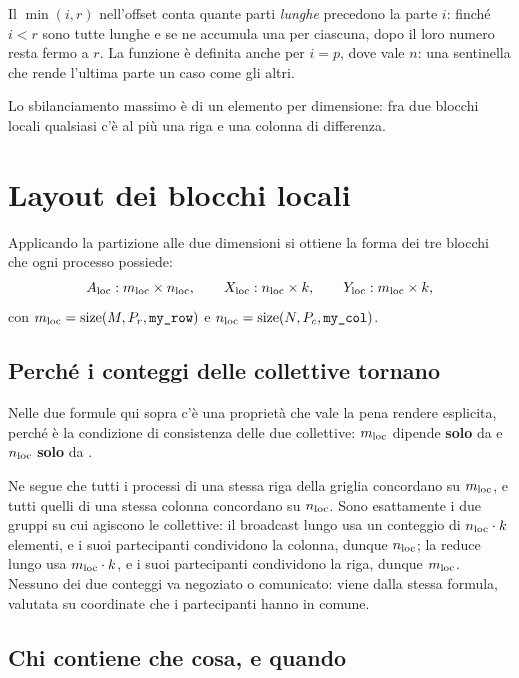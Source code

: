 Il $\min(i,r)$ nell'offset conta quante parti \emph{lunghe} precedono la parte
$i$: finché $i < r$ sono tutte lunghe e se ne accumula una per ciascuna, dopo
il loro numero resta fermo a $r$. La funzione è definita anche per $i = p$,
dove vale $n$: una sentinella che rende l'ultima parte un caso come gli altri.

Lo sbilanciamento massimo è di un elemento per dimensione: fra due blocchi
locali qualsiasi c'è al più una riga e una colonna di differenza.

\section{Layout dei blocchi locali}\label{sec:layout}

Applicando la partizione alle due dimensioni si ottiene la forma dei tre
blocchi che ogni processo possiede:
\begin{equation}
  A_{\text{loc}} : m_{\text{loc}} \times n_{\text{loc}},
  \qquad
  X_{\text{loc}} : n_{\text{loc}} \times k,
  \qquad
  Y_{\text{loc}} : m_{\text{loc}} \times k,
\end{equation}
con $m_{\text{loc}} = \mathrm{size}(M, P_r, \texttt{my\_row})$ e
$n_{\text{loc}} = \mathrm{size}(N, P_c, \texttt{my\_col})$.

\subsection{Perché i conteggi delle collettive tornano}

Nelle due formule qui sopra c'è una proprietà che vale la pena rendere
esplicita, perché è la condizione di consistenza delle due collettive:
$m_{\text{loc}}$ dipende \textbf{solo} da  e $n_{\text{loc}}$ \textbf{solo} da
.

Ne segue che tutti i processi di una stessa riga della griglia concordano su
$m_{\text{loc}}$, e tutti quelli di una stessa colonna concordano su $n_{\text{loc}}$. Sono
esattamente i due gruppi su cui agiscono le collettive: il broadcast lungo
 usa un conteggio di $n_{\text{loc}} \cdot k$ elementi, e i suoi
partecipanti condividono la colonna, dunque $n_{\text{loc}}$; la reduce lungo
 usa $m_{\text{loc}} \cdot k$, e i suoi partecipanti condividono la
riga, dunque $m_{\text{loc}}$. Nessuno dei due conteggi va negoziato o comunicato: viene
dalla stessa formula, valutata su coordinate che i partecipanti hanno in
comune.

\subsection{Chi contiene che cosa, e quando}

